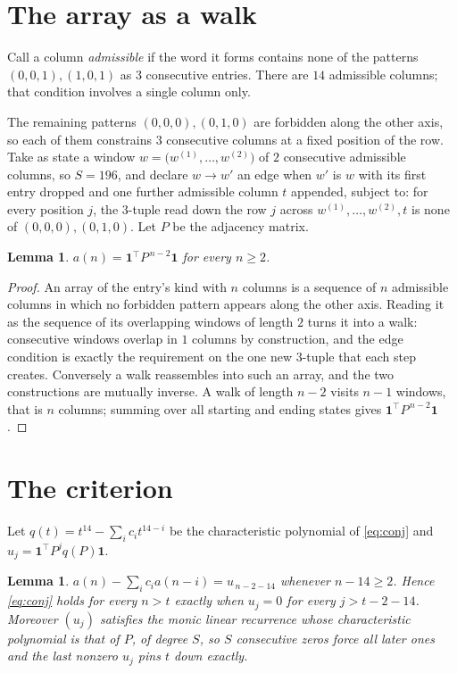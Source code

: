 \documentclass[11pt,a4paper]{article}
\theoremstyle{plain}
\newtheorem{lemma}[theorem]{Lemma}
\theoremstyle{definition}
\begin{document}
\section{The array as a walk}

Call a column \emph{admissible} if the word it forms contains none of the patterns
$(0,0,1), (1,0,1)$ as $3$ consecutive entries. There are $14$ admissible columns; that condition
involves a single column only.

The remaining patterns $(0,0,0), (0,1,0)$ are forbidden along the other axis, so each of them
constrains $3$ consecutive columns at a fixed position of the row. Take as state a
window $w=\bigl(w^{(1)},\dots,w^{(2)}\bigr)$ of $2$ consecutive admissible
columns, so $S=196$, and declare $w\to w'$ an edge when $w'$ is $w$ with its first entry
dropped and one further admissible column $t$ appended, subject to: for every position
$j$, the $3$-tuple read down the row $j$ across $w^{(1)},\dots,w^{(2)},t$
is none of $(0,0,0), (0,1,0)$. Let $P$ be the adjacency matrix.

\begin{lemma}\label{lem:walk}
$a(n)=\mathbf{1}^{\!\top}P^{\,n-2}\mathbf{1}$ for every $n\ge2$.
\end{lemma}

\begin{proof}
An array of the entry's kind with $n$ columns is a sequence of $n$ admissible columns in
which no forbidden pattern appears along the other axis. Reading it as the sequence of its
overlapping windows of length $2$ turns it into a walk: consecutive windows overlap in
$1$ columns by construction, and the edge condition is exactly the requirement on the one
new $3$-tuple that each step creates. Conversely a walk reassembles into such an array,
and the two constructions are mutually inverse. A walk of length $n-2$ visits $n-1$
windows, that is $n$ columns; summing over all starting and ending states gives
$\mathbf{1}^{\!\top}P^{\,n-2}\mathbf{1}$.
\end{proof}

\section{The criterion}

Let $q(t)=t^{14}-\sum_i c_i t^{14-i}$ be the characteristic polynomial of
\eqref{eq:conj} and $u_j=\mathbf{1}^{\!\top}P^{j}q(P)\mathbf{1}$.

\begin{lemma}\label{lem:crit}
$a(n)-\sum_i c_i a(n-i)=u_{\,n-2-14}$ whenever $n-14\ge2$. Hence
\eqref{eq:conj} holds for every $n>t$ exactly when $u_j=0$ for every
$j>t-2-14$. Moreover $(u_j)$ satisfies the monic linear recurrence whose
characteristic polynomial is that of $P$, of degree $S$, so $S$ consecutive zeros force all
later ones and the last nonzero $u_j$ pins $t$ down exactly.
\end{lemma}
\end{document}
